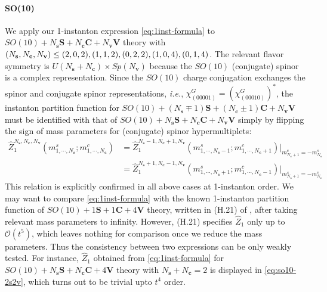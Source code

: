 \documentclass[letterpaper, 11pt]{article}
\newcommand{\nn}{\nonumber}
\begin{document}
{\paragraph{SO(10)}
We apply our 1-instanton expression \eqref{eq:1inst-formula} to $SO(10) + N_{\mathbf s}\mathbf{S} + N_{\mathbf c}\mathbf{C} + N_{\mathbf v}\mathbf{V}$ theory with $( N_{\bf s},  N_{\bf c}, N_{\bf v}) \leq (2,0,2),(1,1,2), (0,2,2),(1,0,4),(0,1,4)$. The relevant flavor symmetry is $U(N_\mathbf{s} + N_\mathbf{c}) \times Sp(N_\mathbf{v})$ because  the $SO(10)$ (conjugate) spinor is a complex representation. Since the $SO(10)$ charge conjugation exchanges the spinor and conjugate spinor representations, 
\textit{i.e.}, $\chi_{(00001)}^G = (\chi_{(00010)}^G)^*$, the instanton partition function for $SO(10) + (N_{\mathbf s}\mp 1)\mathbf{S} + (N_{\mathbf c}\pm 1)\mathbf{C} + N_{\mathbf v}\mathbf{V}$  must be identified with that of $SO(10) + N_{\mathbf s}\mathbf{S} + N_{\mathbf c}\mathbf{C} + N_{\mathbf v}\mathbf{V}$ simply by flipping the sign of mass parameters for (conjugate) spinor hypermultiplets: 
\begin{align}
  \hat{Z}_{1}^{N_{\mathbf{s}},N_\mathbf{c},N_{\mathbf{v}}}(m^s_{1, \cdots, N_\mathbf{s}}; m^c_{1,\cdots,N_\mathbf{c}}) &= \hat{Z}_{1}^{N_{\mathbf{s}}-1,N_\mathbf{c}+1,N_{\mathbf{v}}}(m^s_{1, \cdots, N_\mathbf{s}-1}; m^c_{1,\cdots,N_\mathbf{c}+1})\big|_{m^c_{N_\mathbf{c}+1} = -m^s_{N_\mathbf{s}}}\nn\\ 
  &= \hat{Z}_{1}^{N_{\mathbf{s}}+1,N_\mathbf{c}-1,N_{\mathbf{v}}}(m^s_{1, \cdots, N_\mathbf{s}+1}; m^c_{1,\cdots,N_\mathbf{c}-1})\big|_{m^s_{N_\mathbf{s}+1} = -m^c_{N_\mathbf{c}}}
\end{align}
This relation is explicitly confirmed in all above cases at 1-instanton order. 
We may want to compare \eqref{eq:1inst-formula} with the known 1-instanton partition function of $SO(10) + 1\mathbf{S} + 1\mathbf{C} + 4\mathbf{V}$ theory, written in (H.21) of \cite{DelZotto:2018tcj}, after taking relevant mass parameters  to infinity. However, (H.21) specifies $\hat{Z}_1$ only up to $\mathcal{O}(t^5)$, which leaves nothing for comparison once we reduce the mass parameters. Thus the consistency between two expressions can be only weakly tested. For instance, $\hat{Z}_{1}$ obtained from \eqref{eq:1inst-formula} for $SO(10) + N_\mathbf{s}\mathbf{S}+ N_\mathbf{c}\mathbf{C} + 4\mathbf{V}$ theory with $ N_\mathbf{s} 
+ N_\mathbf{c} = 2$ is displayed in \eqref{eq:so10-2s2v}, which turns out to be trivial upto $t^4$ order.



}
\end{document}
